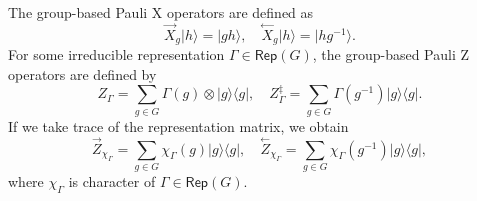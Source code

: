 \documentclass[a4paper,11pt]{article}
\theoremstyle{theorem}
\theoremstyle{remark}
\newcommand{\Rep}{\mathsf{Rep}}
\newcommand{\XR}{\overset{\rightarrow}{X}}
\newcommand{\XL}{\overset{\leftarrow}{X}}
\newcommand{\ZR}{\overset{\rightarrow}{Z}}
\newcommand{\ZL}{\overset{\leftarrow}{Z}}
\begin{document}
The group-based Pauli X operators are defined as 
\begin{equation}
    \XR_g|h\rangle = |gh\rangle,\quad \XL_g|h\rangle =|hg^{-1}\rangle.
\end{equation}
For some irreducible representation $\Gamma \in \Rep(G)$, the group-based Pauli Z operators are defined by
\begin{equation}
    Z_{\Gamma} = \sum_{g\in G} \Gamma(g) \otimes |g\rangle \langle g|,\quad Z^{\ddagger}_{\Gamma}=\sum_{g\in G} \Gamma(g^{-1})|g\rangle \langle g|.
\end{equation}
If we take trace of the representation matrix, we obtain
\begin{equation}
    \ZR_{\chi_{\Gamma}}=\sum_{g\in G} \chi_{\Gamma}(g)|g\rangle\langle g|, \quad \ZL_{\chi_{\Gamma}}=\sum_{g\in G} \chi_{\Gamma}(g^{-1})|g\rangle\langle g|,
\end{equation}
where $\chi_{\Gamma}$ is character of $\Gamma \in \Rep(G)$.
\end{document}
